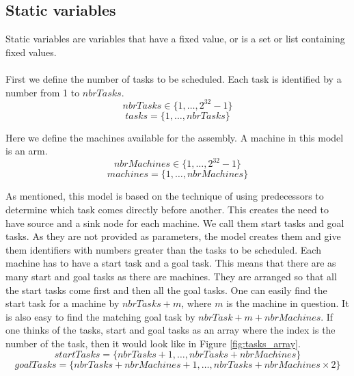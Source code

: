  \subsection{Static variables}
 Static variables are variables that have a fixed value, or is a set or list containing fixed values.
 \\\\
  First we define the number of tasks to be scheduled. Each task is identified by a number from 1 to $nbrTasks$.
 \begin{equation}\label{eq:1}
 nbrTasks \in \{1 , \ldots , 2^{32}-1\}
 \end{equation}
 \begin{equation}\label{eq:10}
 tasks = \{1 , \ldots , nbrTasks\}
 \end{equation}
 
 \noindent Here we define the machines available for the assembly. A machine in this model is an arm.
  \begin{equation}\label{eq:2}
  nbrMachines \in \{1 , \ldots , 2^{32}-1\}
  \end{equation}
  \begin{equation}\label{eq:11}
  machines = \{1 , \ldots , nbrMachines\}
  \end{equation}

  \noindent As mentioned, this model is based on the technique of using predecessors to determine which task comes directly before another. This creates the need to have source and a sink node for each machine. We call them start tasks and goal tasks. As they are not provided as parameters, the model creates them and give them identifiers with numbers greater than the tasks to be scheduled. Each machine has to have a start task and a goal task. This means that there are as many start and goal tasks as there are machines. They are arranged so that all the start tasks come first and then all the goal tasks. One can easily find the start task for a machine by $nbrTasks + m$, where $m$ is the machine in question. It is also easy to find the matching goal task by $nbrTask + m + nbrMachines$. If one thinks of the tasks, start and goal tasks as an array where the index is the number of the task, then it would look  like in Figure \ref{fig:tasks_array}.
 \begin{equation}\label{eq:19}
 startTasks = \{nbrTasks+1 , \ldots , nbrTasks+nbrMachines\}
 \end{equation}
 \begin{equation}\label{eq:20}
 goalTasks = \{nbrTasks+nbrMachines+1 , \ldots , nbrTasks+nbrMachines \times 2\}
 \end{equation}

